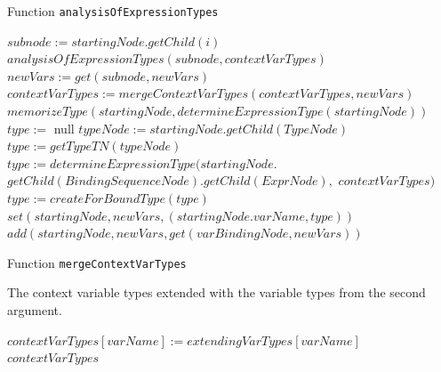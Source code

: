 \begin{algorithm}
\caption{Function \texttt{analysisOfExpressionTypes}}
\label{ALG_func_analysisOfExpressionTypes}
\begin{algorithmic}[1]

    \STATE $subnode := startingNode.getChild(i)$
    \STATE $analysisOfExpressionTypes(subnode, contextVarTypes)$ 
    \STATE $newVars := get(subnode, newVars)$    
    \STATE $contextVarTypes := mergeContextVarTypes(contextVarTypes, newVars)$
\ENDFOR
{}
    \STATE $memorizeType(startingNode, determineExpressionType(startingNode))$
\ENDIF
{}
    \STATE $type :=$ null
    \STATE $typeNode := startingNode.getChild(TypeNode)$
        \STATE $type := getTypeTN(typeNode)$
    \ELSE
        \STATE $type := determineExpressionType(startingNode.$ $getChild(BindingSequenceNode).getChild(ExprNode),$ $contextVarTypes)$
            \STATE $type := createForBoundType(type)$
        \ENDIF
    \ENDIF
    \STATE $set(startingNode, newVars, (startingNode.varName, type))$
        \STATE $add(startingNode, newVars, get(varBindingNode, newVars))$
    \ENDFOR
\ENDIF
\end{algorithmic}
\end{algorithm}

\begin{algorithm}
\caption{Function \texttt{mergeContextVarTypes}}
\label{ALG_function_mergeContextVarTypes}
\begin{algorithmic}[1]
\ENSURE The context variable types extended with the variable types from the second argument.

    \STATE $contextVarTypes[varName] := extendingVarTypes[varName]$
\ENDFOR
\RETURN $contextVarTypes$
\end{algorithmic}
\end{algorithm}

